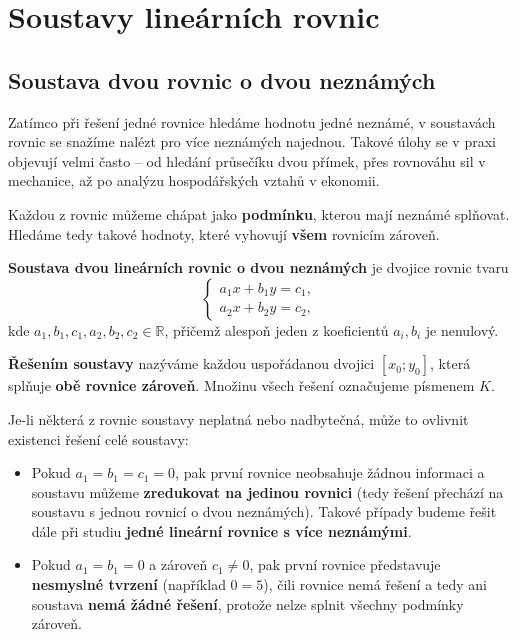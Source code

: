 \documentclass[12pt,a4paper]{article}
\begin{document}
\newpage
\section{Soustavy lineárních rovnic}
\subsection{Soustava dvou rovnic o dvou neznámých}


Zatímco při řešení jedné rovnice hledáme hodnotu jedné neznámé,  
v soustavách rovnic se snažíme nalézt  pro více neznámých najednou.  
Takové úlohy se v praxi objevují velmi často – od hledání průsečíku dvou přímek, přes rovnováhu sil v mechanice,  
až po analýzu hospodářských vztahů v ekonomii.  

\medskip
Každou z rovnic můžeme chápat jako \textbf{podmínku}, kterou mají neznámé splňovat.  
Hledáme tedy takové hodnoty, které vyhovují \textbf{všem} rovnicím zároveň.

\begin{definitionbox}
\textbf{Soustava dvou lineárních rovnic o dvou neznámých} je dvojice rovnic tvaru
\[
\begin{cases}
a_1x + b_1y = c_1,\\[4pt]
a_2x + b_2y = c_2,
\end{cases}
\]
kde \(a_1, b_1, c_1, a_2, b_2, c_2 \in \mathbb{R}\), přičemž alespoň jeden z koeficientů \(a_i, b_i\) je nenulový.

\medskip
\textbf{Řešením soustavy} nazýváme každou uspořádanou dvojici \([x_0;y_0]\), která splňuje \textbf{obě rovnice zároveň}.  
Množinu všech řešení označujeme písmenem \(K\).
\end{definitionbox}

\noindent
Je-li některá z rovnic soustavy neplatná nebo nadbytečná, může to ovlivnit existenci řešení celé soustavy:

\begin{itemize}
  \item Pokud \(a_1 = b_1 = c_1 = 0\), pak první rovnice neobsahuje žádnou informaci  
  a soustavu můžeme \textbf{zredukovat na jedinou rovnici} (tedy řešení přechází na soustavu s jednou rovnicí o dvou neznámých).  
  Takové případy budeme řešit dále při studiu \textbf{jedné lineární rovnice s více neznámými}.
  
  \item Pokud \(a_1 = b_1 = 0\) a zároveň \(c_1 \neq 0\), pak první rovnice představuje \textbf{nesmyslné tvrzení}  
  (například \(0 = 5\)), čili rovnice nemá řešení a tedy ani soustava \textbf{nemá žádné řešení}, protože nelze splnit všechny podmínky zároveň.
\end{itemize}
\end{document}
